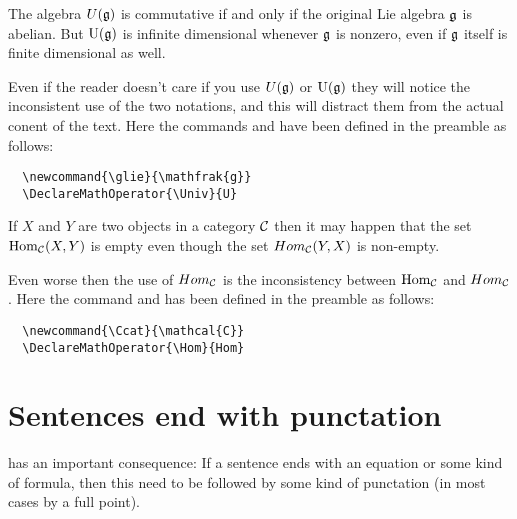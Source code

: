 \documentclass[a4paper, 10pt, abstract=on, headings=standardclasses]{scrartcl}
\begin{document}
\begin{LTXexample}[pos=b]
  The algebra $U(\glie)$ is commutative if and only if the original Lie algebra $\glie$ is abelian.
  But $\Univ(\glie)$ is infinite dimensional whenever $\glie$ is nonzero, even if $\glie$ itself is finite dimensional as well.
\end{LTXexample}
Even if the reader doesn’t care if you use $U(\glie)$ or $\Univ(\glie)$ they will notice the inconsistent use of the two notations, and this will distract them from the actual conent of the text.
Here the commands  and  have been defined in the preamble as follows:
\begin{lstlisting}
  \newcommand{\glie}{\mathfrak{g}}
  \DeclareMathOperator{\Univ}{U}
\end{lstlisting}

\begin{LTXexample}[pos=b]
If $X$ and $Y$ are two objects in a category $\Ccat$ then it may happen that the set $\Hom_{\Ccat}(X,Y)$ is empty even though the set $Hom_{\Ccat}(Y,X)$ is non-empty.
\end{LTXexample}
Even worse then the use of $Hom_{\Ccat}$ is the inconsistency between $\Hom_{\Ccat}$ and $Hom_{\Ccat}$.
Here the command  and  has been defined in the preamble as follows:
\begin{lstlisting}
  \newcommand{\Ccat}{\mathcal{C}}
  \DeclareMathOperator{\Hom}{Hom}
\end{lstlisting}





\section{Sentences end with punctation}

 has an important consequence:
If a sentence ends with an equation or some kind of formula, then this need to be followed by some kind of punctation (in most cases by a full point).
\end{document}
